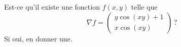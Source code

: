 
\begin{exercice}\label{exoreserve0010}

    Est-ce qu'il existe une fonction \( f(x,y)\) telle que
    \begin{equation}
        \nabla f=\begin{pmatrix}
            y\cos(xy)+1    \\ 
            x\cos(xy)    
        \end{pmatrix}\, ?
    \end{equation}
    Si oui, en donner une.

\end{exercice}
